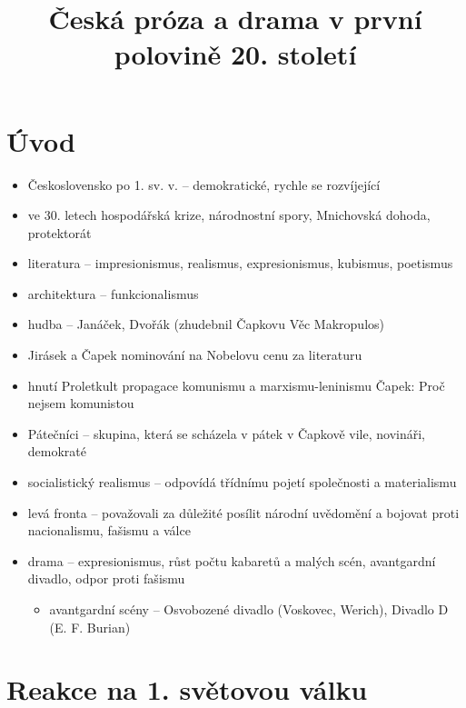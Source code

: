 \title{Česká próza a drama v první polovině 20. století}


\section{Úvod}
\begin{itemize}
\item Československo po 1. sv. v. -- demokratické, rychle se rozvíjející
\item ve 30. letech hospodářská krize, národnostní spory, Mnichovská dohoda, protektorát
\item literatura -- impresionismus, realismus, expresionismus, kubismus, poetismus
\item architektura -- funkcionalismus
\item hudba -- Janáček, Dvořák (zhudebnil Čapkovu Věc Makropulos)
\item Jirásek a Čapek nominování na Nobelovu cenu za literaturu
\item hnutí Proletkult propagace komunismu a marxismu-leninismu \ra Čapek: Proč nejsem komunistou
\item Pátečníci -- skupina, která se scházela v pátek v Čapkově vile, novináři, demokraté
\item socialistický realismus -- odpovídá třídnímu pojetí společnosti a materialismu
\item levá fronta -- považovali za důležité posílit národní uvědomění a bojovat proti nacionalismu, fašismu a válce
\item drama -- expresionismus, růst počtu kabaretů a malých scén, avantgardní divadlo, odpor proti fašismu
	\begin{itemize}
	\item avantgardní scény -- Osvobozené divadlo (Voskovec, Werich), Divadlo D (E. F. Burian)
	\end{itemize}
\end{itemize}

\section{Reakce na 1. světovou válku}

